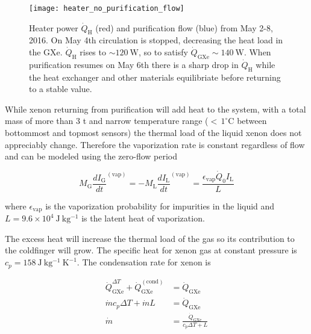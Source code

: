 \begin{figure}
\centering
\texttt{[image: heater\_no\_purification\_flow]}
\caption[Heater power $\dot{Q}_{\mathrm{H}}$ and purification flow from May 2-8, 2016.  Circulation is stopped on May 4th and resumed on the
6th, forcing $\dot{Q}_{\mathrm{H}}$ and $\dot{Q}_{\mathrm{GXe}}$ to equilibriate to new conditions.]{Heater power $\dot{Q}_{\mathrm{H}}$
(red) and purification flow (blue) from May 2-8, 2016.  On May 4th circulation is stopped,
decreasing the heat load in the GXe.  $\dot{Q}_{\mathrm{H}}$ rises to ${\sim}120\ \mathrm{W}$, so to satisfy
 $\dot{Q}_{\mathrm{GXe}} \sim 140\ \mathrm{W}$.  When purification resumes on
May 6th there is a sharp drop in $\dot{Q}_{\mathrm{H}}$ while the heat exchanger and other materials equilibriate before returning to a
stable value.}
\label{fig:electron_lifetime_model_vap_and_cond_no_flow}
\end{figure}

While xenon returning from purification will add heat to the system, with a total mass of more than 3 t and narrow temperature range
(${<}\, 1^{\circ}\mathrm{C}$ between bottommost and topmost sensors) the thermal load of the liquid xenon does not
appreciably change.  Therefore the vaporization rate is constant regardless of flow and can be modeled using the zero-flow period

\vspace{-10pt}

\begin{equation}
M_{\mathrm{G}} \frac{dI_{\mathrm{G}}}{dt}^{(\mathrm{vap})} = -M_{\mathrm{L}} \frac{dI_{\mathrm{L}}}{dt}^{(\mathrm{vap})} =
\frac{\epsilon_{\mathrm{vap}} \dot{Q}_0 I_{\mathrm{L}}}{L}
\end{equation}

\noindent where $\epsilon_{\mathrm{vap}}$ is the vaporization probability for impurities in the liquid and
$L = 9.6 \times 10^4\ \mathrm{J\ kg^{-1}}$ is the latent heat of vaporization.

The excess heat will increase the thermal load of the gas so its contribution to the coldfinger will grow.  The specific heat for
xenon gas at constant pressure is $c_p = 158\ \mathrm{J\ kg^{-1}\ K^{-1}}$.  The condensation rate for xenon is

\begin{equation}
\begin{aligned}
\dot{Q}_{\mathrm{GXe}}^{\Delta T} + \dot{Q}_{\mathrm{GXe}}^{(\mathrm{cond})} &= \dot{Q}_{\mathrm{GXe}} \\
\dot{m} c_p \Delta T + \dot{m} L &= \dot{Q}_{\mathrm{GXe}} \\
\dot{m} &= \frac{\dot{Q}_{\mathrm{GXe}}}{c_p \Delta T + L}
\end{aligned}
\end{equation}

